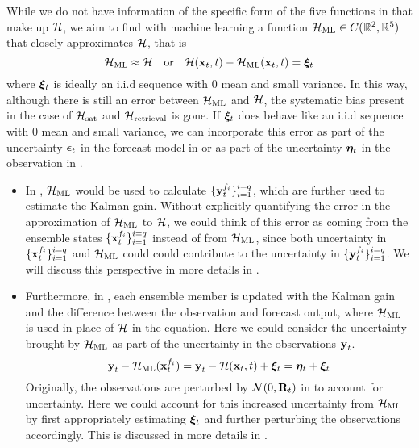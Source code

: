 While we do not have information of the specific form of the five functions in  that make up $\mathcal{H}$, we aim to find with machine learning a function $\mathcal{H}_{\text{ML}}\in C(\mathbb{R}^2,\mathbb{R}^5)$ that closely approximates $\mathcal{H}$, that is
\begin{equation}\label{eq:hml}
\mathcal{H}_{\text{ML}}\approx\mathcal{H} \quad \text{or} \quad \mathcal{H}(\textbf{x}_t,t) - \mathcal{H}_{\text{ML}}(\textbf{x}_t,t) = \bm{\xi}_t
\end{equation}
where $\bm{\xi}_t$ is ideally an i.i.d sequence with $0$ mean and small variance. In this way, although there is still an error between $\mathcal{H}_{\text{ML}}$ and $\mathcal{H}$, the systematic bias present in the case of $\mathcal{H}_{\text{sat}}$ and $\mathcal{H}_{\text{retrieval}}$ is gone. If $\bm{\xi}_t$ does behave like an i.i.d sequence with $0$ mean and small variance, we can incorporate this error as part of the uncertainty $\bm{\epsilon}_t$ in the forecast model in  or as part of the uncertainty $\bm{\eta}_t$ in the observation in .
\begin{itemize}
    \item In , $\mathcal{H}_{\text{ML}}$ would be used to calculate $\{\textbf{y}_t^{f_i}\}_{i=1}^{i=q}$, which are further used to estimate the Kalman gain. Without explicitly quantifying the error in the approximation of $\mathcal{H}_{\text{ML}}$ to $\mathcal{H}$, we could think of this error as coming from the ensemble states $\{\textbf{x}_t^{f_i}\}_{i=1}^{i=q}$ instead of from $\mathcal{H}_{\text{ML}}$, since both uncertainty in $\{\textbf{x}_t^{f_i}\}_{i=1}^{i=q}$ and $\mathcal{H}_{\text{ML}}$ could could contribute to the uncertainty in $\{\textbf{y}_t^{f_i}\}_{i=1}^{i=q}$. We will discuss this perspective in more details in .
    \item Furthermore, in , each ensemble member is updated with the Kalman gain and the difference between the observation and forecast output, where $\mathcal{H}_{\text{ML}}$ is used in place of $\mathcal{H}$ in the equation. Here we could consider the uncertainty brought by $\mathcal{H}_{\text{ML}}$ as part of the uncertainty in the observations $\textbf{y}_t$.
    \begin{equation}
    \textbf{y}_t - \mathcal{H}_{\text{ML}}(\textbf{x}_t^{f_i}) = \textbf{y}_t - \mathcal{H}(\textbf{x}_t,t) + \bm{\xi}_t = \bm{\eta}_t + \bm{\xi}_t
    \end{equation}
Originally, the observations are perturbed by $\mathcal{N}(0,\textbf{R}_t)$ in  to account for uncertainty. Here we could account for this increased uncertainty from $\mathcal{H}_{\text{ML}}$ by first appropriately estimating $\bm{\xi}_t$ and further perturbing the observations accordingly. This is discussed in more details in .
\end{itemize} 

